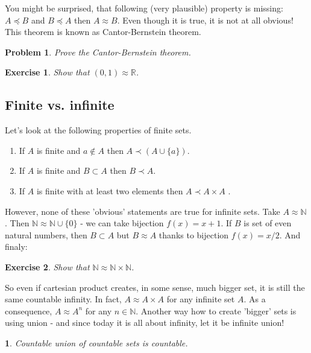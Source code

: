 \documentclass[11pt,a5paper]{article}
\newtheorem{theorem}{}
\newtheorem{exercise}{Exercise}
\newtheorem{problem}{Problem}
\begin{document}
\noindent You might be surprised, that following (very plausible) property is missing: $A\preceq B$ and $B\preceq A$ then $A\approx B$. Even though it is true, it is not at all obvious! This theorem is known as Cantor-Bernstein theorem.

\begin{problem} 
Prove the Cantor-Bernstein theorem.
\end{problem}

\begin{exercise} 
Show that $(0,1)\approx\mathbb{R}$.
\end{exercise}

\subsection*{Finite vs. infinite}

\noindent Let's look at the following properties of finite sets.
\begin{enumerate}
  \item If $A$ is finite and $a \not\in A$ then $A\prec (A\cup \{a\})$.
  \item If $A$ is finite and $B\subset A$ then $B\prec A$.
  \item If $A$ is finite with at least two elements then $A \prec A\times A$ .
\end{enumerate}

\noindent However, none of these 'obvious' statements are true for infinite sets. Take $A\approx \mathbb{N}$. Then $\mathbb{N} \approx \mathbb{N}\cup \{0\}$ - we can take bijection $f(x) = x+1$. If $B$ is set of even natural numbers, then $B\subset A$ but $B\approx A$ thanks to bijection $f(x) = x/2$. And finaly:
\begin{exercise}
Show that $\mathbb{N} \approx \mathbb{N} \times \mathbb{N}$.
\end{exercise}

\noindent So even if cartesian product creates, in some sense, much bigger set, it is still the same countable infinity. In fact, $A\approx A\times A$ for any infinite set $A$. As a consequence, $A\approx A^n$ for any $n\in \mathbb{N}$. Another way how to create 'bigger' sets is using union - and since today it is all about infinity, let it be infinite union!

\begin{theorem}
Countable union of countable sets is countable.
\end{theorem}
\end{document}
